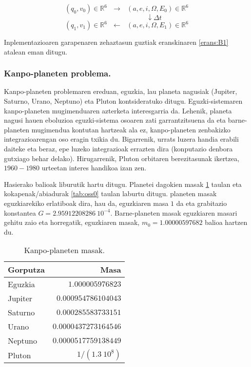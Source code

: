 \begin{equation*}
(q_0,v_0) \in \mathbb{R}^6 \ \ \ \longrightarrow \ \ \  (a,e,i,\Omega,E_0) \in \mathbb{R}^6 
\end{equation*}
\begin{equation*}
\quad \quad \quad \quad \quad \quad \quad \quad \downarrow \Delta t
\end{equation*}
\begin{equation*}
(q_1,v_1) \in \mathbb{R}^6 \ \ \ \longleftarrow \ \ \  (a,e,i,\Omega,E_1) \in \mathbb{R}^6 
\end{equation*}

Inplementazioaren garapenaren zehaztasun guztiak eranskinaren \ref{erans:B1} atalean eman ditugu.
 

\subsubsection*{Kanpo-planeten problema.}


Kanpo-planeten problemaren ereduan, eguzkia, lau planeta nagusiak (Jupiter, Saturno, Urano, Neptuno) eta Pluton kontsideratuko ditugu. Eguzki-sistemaren kanpo-planeten  mugimenduaren azterketa interesgarria da. Lehenik, planeta nagusi hauen eboluzioa eguzki-sistema osoaren zati garrantzitsuena da eta barne-planeten mugimendua kontutan hartzeak ala ez, kanpo-planeten zenbakizko integrazioarengan oso eragin txikia du. Bigarrenik, urrats luzera handia erabili daiteke eta beraz, epe luzeko integrazioak errazten dira (konputazio denbora gutxiago behar delako). Hirugarrenik, Pluton orbitaren berezitasunak ikertzea,  $1960-1980$ urteetan interes handikoa izan zen.        


Hasierako balioak \cite{Hairer2006} liburutik hartu ditugu. Planetei dagokien masak \ref{tab:ossm0} taulan eta kokapenak/abiadurak \ref{tab:oss0} taulan laburtu ditugu. planeten masak eguzkiarekiko erlatiboak dira, hau da, eguzkiaren masa $1$ da eta grabitazio konstantea $G=2.95912208286 \ 10^{-4}$. Barne-planeten masak eguzkiaren masari gehitu zaio eta horregatik, eguzkiaren masak, $m_0=1.00000597682$ balioa hartzen du.

\begin{table}[h]
\caption{Kanpo-planeten masak.}
\label{tab:ossm0}       %
\centering
\begin{tabular}{ l r }
\hline 
  Gorputza         &  Masa        
\\\hline
  Eguzkia          &  $1.000005976823$ \\
  Jupiter          &  $0.000954786104043$ \\
  Saturno          &  $0.000285583733151$ \\
  Urano            &  $0.0000437273164546$ \\
  Neptuno          &  $0.0000517759138449$ \\
  Pluton           &  ${1}/{(1.3 \ 10^8)}$ \\
\hline  
\end{tabular}
\end{table}

